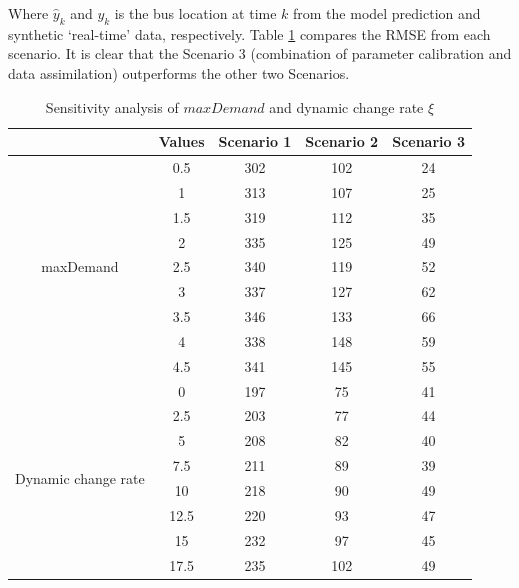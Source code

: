 Where $\hat{y}_k$ and $y_k$ is the bus location at time $k$ from the model prediction and synthetic `real-time' data, respectively. Table \ref{tab:sensitivity} compares the RMSE from each scenario. It is clear that the Scenario 3 (combination of parameter calibration and data assimilation) outperforms the other two Scenarios. 

\begin{table}[ht]
  \centering
  \caption{Sensitivity analysis of $maxDemand$ and dynamic change rate $\xi$}
    \begin{tabular}{ccccc}
    \toprule
          & \textbf{Values} & \textbf{Scenario 1} & \textbf{Scenario 2} & \textbf{Scenario 3} \\
    \midrule
    \multicolumn{1}{c}{\multirow{9}[2]{*}{maxDemand }} & 0.5   & 302   & 102   & 24 \\
          & 1     & 313   & 107   & 25 \\
          & 1.5   & 319   & 112   & 35 \\
          & 2     & 335   & 125   & 49 \\
          & 2.5   & 340   & 119   & 52 \\
          & 3     & 337   & 127   & 62 \\
          & 3.5   & 346   & 133   & 66 \\
          & 4     & 338   & 148   & 59 \\
          & 4.5   & 341   & 145   & 55 \\
    \midrule
    \multicolumn{1}{c}{\multirow{8}[2]{*}{Dynamic change rate}} & 0     & 197   & 75    & 41 \\
          & 2.5   & 203   & 77    & 44 \\
          & 5     & 208   & 82    & 40 \\
          & 7.5   & 211   & 89    & 39 \\
          & 10    & 218   & 90    & 49 \\
          & 12.5  & 220   & 93    & 47 \\
          & 15    & 232   & 97    & 45 \\
          & 17.5  & 235   & 102   & 49 \\
    \bottomrule
    \end{tabular}%
  \label{tab:sensitivity}%
\end{table}%


